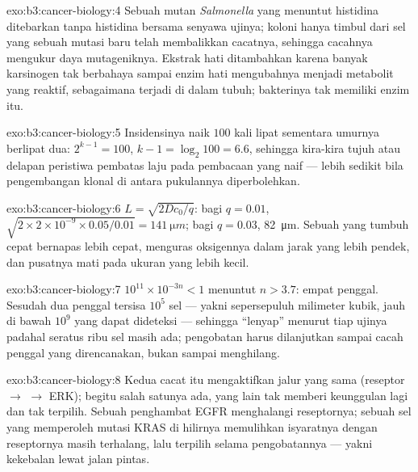 \begin{solution}{exo:b3:cancer-biology:4}
Sebuah mutan \emph{Salmonella} yang menuntut histidina ditebarkan tanpa
histidina bersama senyawa ujinya; koloni hanya timbul dari sel yang
sebuah mutasi baru telah membalikkan cacatnya, sehingga cacahnya mengukur
daya mutageniknya. Ekstrak hati ditambahkan karena banyak karsinogen tak
berbahaya sampai enzim hati mengubahnya menjadi metabolit yang reaktif,
sebagaimana terjadi di dalam tubuh; bakterinya tak memiliki enzim itu.
\end{solution}

\begin{solution}{exo:b3:cancer-biology:5}
Insidensinya naik $100$ kali lipat sementara umurnya berlipat dua: $2^{k-1} = 100$, $k - 1 =
\log_{2}100 = 6.6$, sehingga kira-kira tujuh atau delapan peristiwa pembatas
laju pada pembacaan yang naif --- lebih sedikit bila pengembangan klonal di
antara pukulannya diperbolehkan.
\end{solution}

\begin{solution}{exo:b3:cancer-biology:6}
$L = \sqrt{2Dc_{0}/q}$: bagi $q = 0.01$, $\sqrt{2\times 2\times 10^{-9}
\times 0.05/0.01} = \qty{141}{\micro m}$; bagi $q = 0.03$,
\qty{82}{\micro m}. Sebuah  yang tumbuh cepat bernapas lebih cepat,
menguras oksigennya dalam jarak yang lebih pendek, dan pusatnya mati pada
ukuran yang lebih kecil.
\end{solution}

\begin{solution}{exo:b3:cancer-biology:7}
$10^{11}\times 10^{-3n} < 1$ menuntut $n > 3.7$: empat penggal. Sesudah dua
penggal tersisa $10^{5}$ sel --- yakni sepersepuluh milimeter kubik, jauh
di bawah $10^{9}$ yang dapat dideteksi --- sehingga 
``lenyap'' menurut tiap ujinya padahal seratus ribu sel masih ada; pengobatan
harus dilanjutkan sampai cacah penggal yang direncanakan, bukan sampai 
menghilang.
\end{solution}

\begin{solution}{exo:b3:cancer-biology:8}
Kedua cacat itu mengaktifkan jalur yang sama (reseptor $\to$  $\to$ ERK);
begitu salah satunya ada, yang lain tak memberi keunggulan lagi dan tak
terpilih. Sebuah penghambat EGFR menghalangi reseptornya; sebuah sel yang
memperoleh mutasi KRAS di hilirnya memulihkan isyaratnya dengan reseptornya
masih terhalang, lalu terpilih selama pengobatannya --- yakni kekebalan lewat
jalan pintas.
\end{solution}

